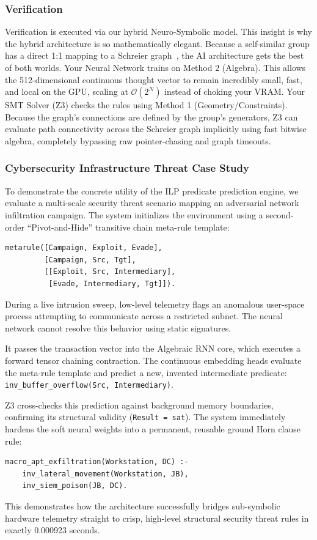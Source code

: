 \documentclass[twocolumn]{article}
\begin{document}
\subsubsection{Verification}
Verification is executed via our hybrid Neuro-Symbolic model. This insight is why the hybrid architecture is so mathematically elegant. Because a self-similar group has a direct 1:1 mapping to a Schreier graph~\cite{grigorchuk2006}, the AI architecture gets the best of both worlds. Your Neural Network trains on Method 2 (Algebra). This allows the 512-dimensional continuous thought vector to remain incredibly small, fast, and local on the GPU, scaling at $\mathcal{O}(2^N)$ instead of choking your VRAM. Your SMT Solver (Z3) checks the rules using Method 1 (Geometry/Constraints). Because the graph's connections are defined by the group's generators, Z3 can evaluate path connectivity across the Schreier graph implicitly using fast bitwise algebra, completely bypassing raw pointer-chasing and graph timeouts.

\subsubsection{Cybersecurity Infrastructure Threat Case Study}
To demonstrate the concrete utility of the ILP predicate prediction engine, we evaluate a multi-scale security threat scenario mapping an adversarial network infiltration campaign. The system initializes the environment using a second-order ``Pivot-and-Hide'' transitive chain meta-rule template:
\begin{verbatim}
metarule([Campaign, Exploit, Evade], 
         [Campaign, Src, Tgt], 
         [[Exploit, Src, Intermediary], 
          [Evade, Intermediary, Tgt]]).
\end{verbatim}
During a live intrusion sweep, low-level telemetry flags an anomalous user-space process attempting to communicate across a restricted subnet. The neural network cannot resolve this behavior using static signatures. 

It passes the transaction vector into the Algebraic RNN core, which executes a forward tensor chaining contraction. The continuous embedding heads evaluate the meta-rule template and predict a new, invented intermediate predicate: \texttt{inv\_buffer\_overflow(Src, Intermediary)}. 

Z3 cross-checks this prediction against background memory boundaries, confirming its structural validity (\texttt{Result = sat}). The system immediately hardens the soft neural weights into a permanent, reusable ground Horn clause rule:
\begin{verbatim}
macro_apt_exfiltration(Workstation, DC) :-
    inv_lateral_movement(Workstation, JB),
    inv_siem_poison(JB, DC).
\end{verbatim}
This demonstrates how the architecture successfully bridges sub-symbolic hardware telemetry straight to crisp, high-level structural security threat rules in exactly 0.000923 seconds.
\end{document}
